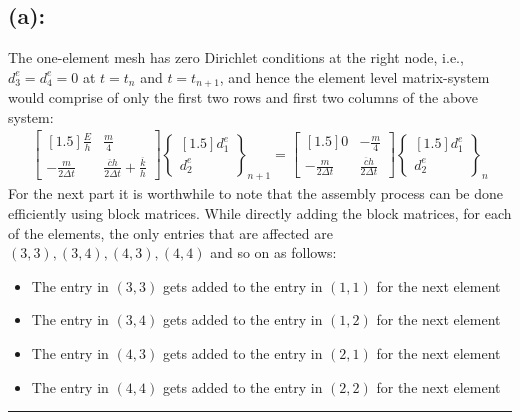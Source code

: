 \subsection*{(a): }
The one-element mesh has zero Dirichlet conditions at the right node, i.e., $d^e_3 = d^e_4 = 0$ at $t=t_n$ and $t=t_{n+1}$, and hence the element level matrix-system would comprise of only the first two rows and first two columns of the above system: 
\begin{align*}
\begin{bmatrix}[1.5]
\frac{E}{h} & \frac{m}{4} \\
-\frac{m}{2\Delta t} & \frac{\overline{c}h}{2\Delta t}+ \frac{\overline{k}}{h}
\end{bmatrix}
\begin{Bmatrix}[1.5]
d^e_1\\d^e_2
\end{Bmatrix}_{n+1}
=
\begin{bmatrix}[1.5]
0 & -\frac{m}{4} \\
-\frac{m}{2\Delta t} & \frac{\overline{c}h}{2\Delta t}
\end{bmatrix}
\begin{Bmatrix}[1.5]
d^e_1\\d^e_2
\end{Bmatrix}_{n}
\end{align*} 
For the next part it is worthwhile to note that the assembly process can be done efficiently using block matrices. While directly adding the block matrices, for each of the elements, the only entries that are affected are $(3,3),(3,4),(4,3),(4,4)$ and so on as follows: 
\begin{itemize}
\item The entry in $(3,3)$ gets added to the entry in $(1,1)$ for the next element
\item The entry in $(3,4)$ gets added to the entry in $(1,2)$ for the next element
\item The entry in $(4,3)$ gets added to the entry in $(2,1)$ for the next element
\item The entry in $(4,4)$ gets added to the entry in $(2,2)$ for the next element
\end{itemize} \hrule
